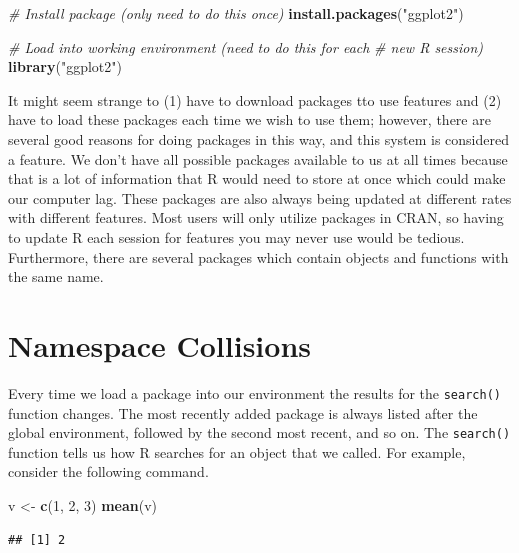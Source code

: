 \documentclass[
]{book}
\newenvironment{Shaded}{\begin{snugshade}}{\end{snugshade}}
\newcommand{\CommentTok}[1]{\textcolor[rgb]{0.56,0.35,0.01}{\textit{#1}}}
\newcommand{\DecValTok}[1]{\textcolor[rgb]{0.00,0.00,0.81}{#1}}
\newcommand{\KeywordTok}[1]{\textcolor[rgb]{0.13,0.29,0.53}{\textbf{#1}}}
\newcommand{\NormalTok}[1]{#1}
\newcommand{\StringTok}[1]{\textcolor[rgb]{0.31,0.60,0.02}{#1}}
\begin{document}
\begin{Shaded}
\begin{Highlighting}[]
\CommentTok{# Install package (only need to do this once)}
\KeywordTok{install.packages}\NormalTok{(}\StringTok{"ggplot2"}\NormalTok{)}

\CommentTok{# Load into working environment (need to do this for each}
\CommentTok{# new R session)}
\KeywordTok{library}\NormalTok{(}\StringTok{"ggplot2"}\NormalTok{)}
\end{Highlighting}
\end{Shaded}

It might seem strange to (1) have to download packages tto use features and (2) have to load these packages each time we wish to use them; however, there are several good reasons for doing packages in this way, and this system is considered a feature. We don't have all possible packages available to us at all times because that is a lot of information that R would need to store at once which could make our computer lag. These packages are also always being updated at different rates with different features. Most users will only utilize packages in CRAN, so having to update R each session for features you may never use would be tedious. Furthermore, there are several packages which contain objects and functions with the same name.

\hypertarget{namespace-collisions}{%
\section{Namespace Collisions}\label{namespace-collisions}}

Every time we load a package into our environment the results for the \texttt{search()} function changes. The most recently added package is always listed after the global environment, followed by the second most recent, and so on.
The \texttt{search()} function tells us how R searches for an object that we called. For example, consider the following command.

\begin{Shaded}
\begin{Highlighting}[]
\NormalTok{v <-}\StringTok{ }\KeywordTok{c}\NormalTok{(}\DecValTok{1}\NormalTok{, }\DecValTok{2}\NormalTok{, }\DecValTok{3}\NormalTok{)}
\KeywordTok{mean}\NormalTok{(v)}
\end{Highlighting}
\end{Shaded}

\begin{verbatim}
## [1] 2
\end{verbatim}
\end{document}
